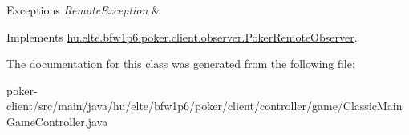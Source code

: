\begin{DoxyExceptions}{Exceptions}
{\em Remote\+Exception} & \\
\hline
\end{DoxyExceptions}


Implements \hyperlink{interfacehu_1_1elte_1_1bfw1p6_1_1poker_1_1client_1_1observer_1_1_poker_remote_observer_a3b701b6771f57bd6fb8afb247d08c47d}{hu.\+elte.\+bfw1p6.\+poker.\+client.\+observer.\+Poker\+Remote\+Observer}.



The documentation for this class was generated from the following file\+:\begin{DoxyCompactItemize}
\item 
poker-\/client/src/main/java/hu/elte/bfw1p6/poker/client/controller/game/Classic\+Main\+Game\+Controller.\+java\end{DoxyCompactItemize}
